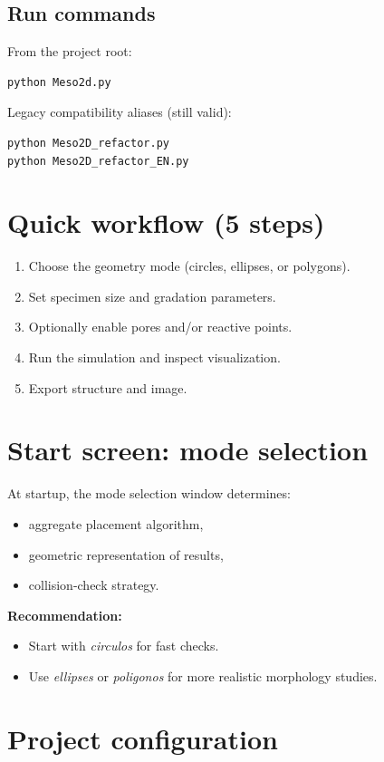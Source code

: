 \documentclass[11pt,a4paper]{article}
\begin{document}
\subsection{Run commands}
From the project root:
\begin{lstlisting}[style=cmd]
python Meso2d.py
\end{lstlisting}

Legacy compatibility aliases (still valid):
\begin{lstlisting}[style=cmd]
python Meso2D_refactor.py
python Meso2D_refactor_EN.py
\end{lstlisting}

\section{Quick workflow (5 steps)}
\begin{enumerate}[leftmargin=1.7em]
  \item Choose the geometry mode (circles, ellipses, or polygons).
  \item Set specimen size and gradation parameters.
  \item Optionally enable pores and/or reactive points.
  \item Run the simulation and inspect visualization.
  \item Export structure and image.
\end{enumerate}

\section{Start screen: mode selection}
At startup, the mode selection window determines:
\begin{itemize}[leftmargin=1.5em]
  \item aggregate placement algorithm,
  \item geometric representation of results,
  \item collision-check strategy.
\end{itemize}

\textbf{Recommendation:}
\begin{itemize}[leftmargin=1.5em]
  \item Start with \textit{circulos} for fast checks.
  \item Use \textit{ellipses} or \textit{poligonos} for more realistic morphology studies.
\end{itemize}

\section{Project configuration}
\end{document}
